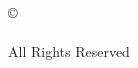 \ifdefined\copyrightreg
\doublespacing
\begin{center}

    \vspace*{\fill}

\copyright \\
\studentname \\
All Rights Reserved
\end{center}
\else
\newpage
\
\newpage
\fi


